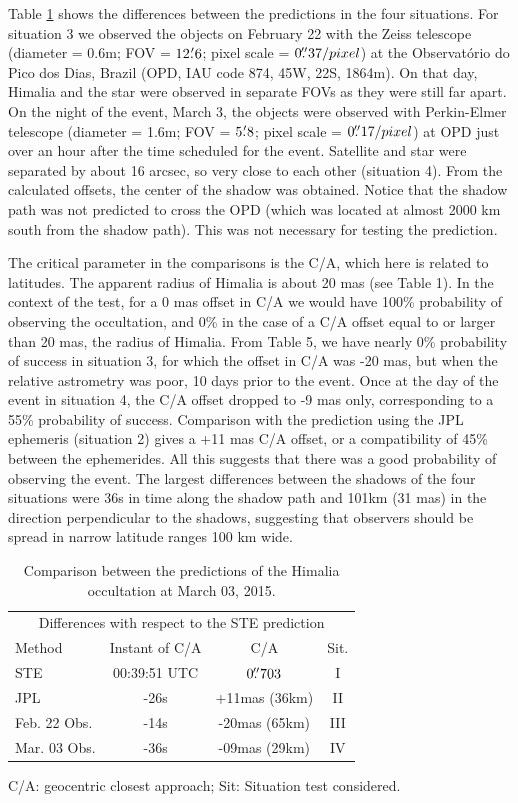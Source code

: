 \documentclass[useAMS,usenatbib]{mn2e}
\begin{document}
Table \ref{Tab: comparison-Himalia} shows the differences between the predictions in the four situations. For situation 3 we observed the objects on February 22 with the Zeiss telescope (diameter = 0.6m; FOV = $12\hbox{$.\mkern-4mu^\prime$}6$; pixel scale = $0\hbox{$.\!\!^{\prime\prime}$}37 / pixel$) at the Observatório do Pico dos Dias, Brazil (OPD, IAU code 874, 45\arcsec W, 22\arcsec S, 1864m). On that day, Himalia and the star were observed in separate FOVs as they were still far apart. On the night of the event, March 3, the objects were observed with Perkin-Elmer telescope (diameter = 1.6m; FOV = $5\hbox{$.\mkern-4mu^\prime$}8$; pixel scale = $0\hbox{$.\!\!^{\prime\prime}$}17 / pixel$) at OPD just over an hour after the time scheduled for the event. Satellite and star were separated by about 16 arcsec, so very close to each other (situation 4). From the calculated offsets, the center of the shadow was obtained. Notice that the shadow path was not predicted to cross the OPD (which was located at almost 2000 km south from the shadow path). This was not necessary for testing the prediction.

The critical parameter in the comparisons is the C/A, which here is related to latitudes. The apparent radius of Himalia is about 20 mas (see Table 1). In the context of the test, for a 0 mas offset in C/A we would have 100\% probability of observing the occultation, and 0\% in the case of a C/A offset equal to or larger than 20 mas, the radius of Himalia. From Table 5, we have nearly 0\% probability of success in situation 3, for which the offset in C/A was -20 mas, but when the relative astrometry was poor, 10 days prior to the event. Once at the day of the event in situation 4, the C/A offset dropped to -9 mas only, corresponding to a 55\% probability of success. Comparison with the prediction using the JPL ephemeris (situation 2) gives a +11 mas C/A offset, or a compatibility of 45\% between the ephemerides. All this suggests that there was a good probability of observing the event. The largest differences between the shadows of the four situations were 36s in time along the shadow path and 101km (31 mas) in the direction perpendicular to the shadows, suggesting that observers should be spread in narrow latitude ranges 100 km wide.

\begin{table}
\caption{\label{Tab: comparison-Himalia} Comparison between the predictions of the Himalia occultation at March 03, 2015.}
\begin{centering}
\begin{tabular}{lccc}
\hline  \hline
\multicolumn{4}{c}{Differences with respect to the STE prediction} \tabularnewline
Method  & Instant of C/A  & C/A & Sit.   \tabularnewline
\hline
STE & 00:39:51 UTC & $0\hbox{$.\!\!^{\prime\prime}$}703$ & I \tabularnewline
JPL & -26s & +11mas (36km) & II \tabularnewline %
Feb. 22 Obs. & -14s & -20mas (65km) & III \tabularnewline %
Mar. 03 Obs. & -36s & -09mas (29km) & IV \tabularnewline %
\hline
\end{tabular}
\par\end{centering}
C/A: geocentric closest approach; Sit: Situation test considered.
\end{table}
\end{document}
